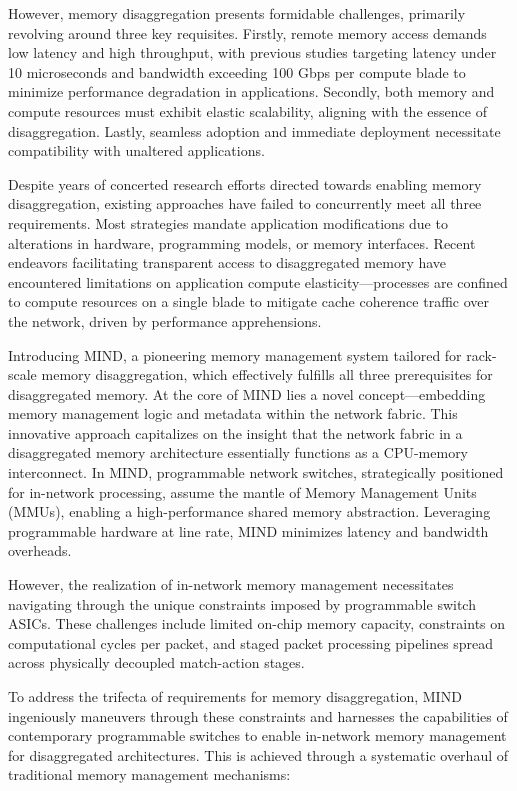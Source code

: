 However, memory disaggregation presents formidable challenges, primarily revolving around three key requisites. Firstly, remote memory access demands low latency and high throughput, with previous studies targeting latency under 10 microseconds and bandwidth exceeding 100 Gbps per compute blade to minimize performance degradation in applications. Secondly, both memory and compute resources must exhibit elastic scalability, aligning with the essence of disaggregation. Lastly, seamless adoption and immediate deployment necessitate compatibility with unaltered applications.

Despite years of concerted research efforts directed towards enabling memory disaggregation, existing approaches have failed to concurrently meet all three requirements. Most strategies mandate application modifications due to alterations in hardware, programming models, or memory interfaces. Recent endeavors facilitating transparent access to disaggregated memory have encountered limitations on application compute elasticity—processes are confined to compute resources on a single blade to mitigate cache coherence traffic over the network, driven by performance apprehensions.

Introducing MIND, a pioneering memory management system tailored for rack-scale memory disaggregation, which effectively fulfills all three prerequisites for disaggregated memory. At the core of MIND lies a novel concept—embedding memory management logic and metadata within the network fabric. This innovative approach capitalizes on the insight that the network fabric in a disaggregated memory architecture essentially functions as a CPU-memory interconnect. In MIND, programmable network switches, strategically positioned for in-network processing, assume the mantle of Memory Management Units (MMUs), enabling a high-performance shared memory abstraction. Leveraging programmable hardware at line rate, MIND minimizes latency and bandwidth overheads.

However, the realization of in-network memory management necessitates navigating through the unique constraints imposed by programmable switch ASICs. These challenges include limited on-chip memory capacity, constraints on computational cycles per packet, and staged packet processing pipelines spread across physically decoupled match-action stages.

To address the trifecta of requirements for memory disaggregation, MIND ingeniously maneuvers through these constraints and harnesses the capabilities of contemporary programmable switches to enable in-network memory management for disaggregated architectures. This is achieved through a systematic overhaul of traditional memory management mechanisms:

